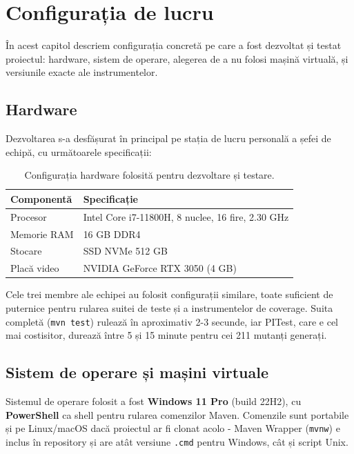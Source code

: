 \chapter{Configurația de lucru}
\label{ch:configurare}

În acest capitol descriem configurația concretă pe care a fost dezvoltat și testat proiectul: hardware, sistem de operare, alegerea de a nu folosi mașină virtuală, și versiunile exacte ale instrumentelor.

\section{Hardware}

Dezvoltarea s-a desfășurat în principal pe stația de lucru personală a șefei de echipă, cu următoarele specificații:

\begin{table}[!htb]
\centering
\caption{Configurația hardware folosită pentru dezvoltare și testare.}
\label{tab:hardware}
\begin{tabular}{ll}
\toprule
\textbf{Componentă} & \textbf{Specificație} \\
\midrule
Procesor & Intel Core i7-11800H, 8 nuclee, 16 fire, 2.30 GHz \\
Memorie RAM & 16 GB DDR4 \\
Stocare & SSD NVMe 512 GB \\
Placă video & NVIDIA GeForce RTX 3050 (4 GB) \\
\bottomrule
\end{tabular}
\end{table}

Cele trei membre ale echipei au folosit configurații similare, toate suficient de puternice pentru rularea suitei de teste și a instrumentelor de coverage. Suita completă (\texttt{mvn test}) rulează în aproximativ 2-3 secunde, iar PITest, care e cel mai costisitor, durează între 5 și 15 minute pentru cei 211 mutanți generați.

\section{Sistem de operare și mașini virtuale}

Sistemul de operare folosit a fost \textbf{Windows 11 Pro} (build 22H2), cu \textbf{PowerShell} ca shell pentru rularea comenzilor Maven. Comenzile sunt portabile și pe Linux/macOS dacă proiectul ar fi clonat acolo - Maven Wrapper (\texttt{mvnw}) e inclus în repository și are atât versiune \texttt{.cmd} pentru Windows, cât și script Unix.

